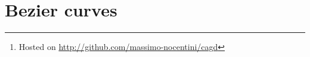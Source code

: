 \documentclass{article}
\begin{document}
\title{\rmfamily\normalfont{}}

\author{}
\date{\today}

\maketitle


\begin{abstract}
  This document contains some exercises and collects my work done during
  the CAGD course given by Prof. Alessandra Sestini and Prof. Costanza
  Conti at University of Florence.

  In particular, here we collect exercises requested by Prof.
  Costanza Conti about Bezier and BSplines curves. We implement numerical
  methods using Julia  language \cite{Julia} and everything (code for
  solving exercises and \TeX sources of this document) is under
  version control, available as open source Git repository
  \footnote{Hosted on \url{http://github.com/massimo-nocentini/cagd}},
  under \emph{MIT License}.
\end{abstract}

\tableofcontents

\newpage

\section{Bezier curves}
\end{document}
